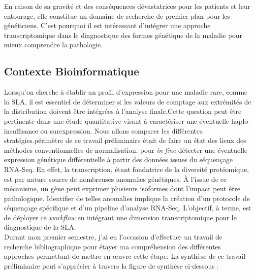 En raison de sa gravité et des conséquences dévastatrices pour les patients et leur entourage, elle constitue un domaine de recherche de premier plan pour les généticiens.
C'est pourquoi il est intéressant d’intégrer une approche transcriptomique dans le diagnostique des formes génétique de la maladie pour mieux comprendre la pathologie.



\subsection{Contexte Bioinformatique}

Lorsqu’on cherche à établir un profil d'expression pour une maladie rare, comme la SLA, il est essentiel de déterminer si les valeurs de comptage aux extrémités de la distribution
 doivent être intégrées à l'analyse finale.Cette question peut être pertinente dans une étude quantitative visant à caractériser une éventuelle haplo-insuffisance ou surexpression. Nous allons comparer les différentes stratégies.\Le périmètre de ce travail préliminaire était de faire un état des lieux des méthodes conventionnelles de normalisation,
pour \textit{in fine} détecter une éventuelle expression génétique différentielle à partir des données issues du séquençage RNA-Seq.
En effet, la transcription, étant fondatrice de la diversité protéomique, est par nature source de nombreuses anomalies génétiques. À l’issue de ce mécanisme,
un gène peut exprimer plusieurs isoformes dont l’impact peut être pathologique. Identifier de telles anomalies implique la création d’un protocole de séquençage spécifique et
d’un pipeline d’analyse RNA-Seq. L’objectif, à terme, est de déployer ce \textit{workflow} en intégrant une dimension transcriptomique pour le diagnostique de la SLA.\\
Durant mon premier semestre, j’ai eu l’occasion d’effectuer un travail de recherche bibliographique pour étayer ma compréhension des différentes approches permettant de mettre en œuvre cette étape.
La synthèse de ce travail préliminaire peut s’apprécier à travers la figure de synthèse ci-dessous :

